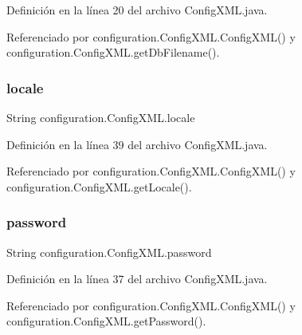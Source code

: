 Definición en la línea 20 del archivo Config\+X\+M\+L.\+java.



Referenciado por configuration.\+Config\+X\+M\+L.\+Config\+X\+M\+L() y configuration.\+Config\+X\+M\+L.\+get\+Db\+Filename().

\mbox{\label{classconfiguration_1_1_config_x_m_l_a34c81c18f387adacbf595cee3c0229b0}} 
\subsubsection{\texorpdfstring{locale}{locale}}
{\footnotesize\ttfamily String configuration.\+Config\+X\+M\+L.\+locale\hspace{0.3cm}{\ttfamily [private]}}



Definición en la línea 39 del archivo Config\+X\+M\+L.\+java.



Referenciado por configuration.\+Config\+X\+M\+L.\+Config\+X\+M\+L() y configuration.\+Config\+X\+M\+L.\+get\+Locale().

\mbox{\label{classconfiguration_1_1_config_x_m_l_a719187d1ff6398218cb8f6d7b0f53763}} 
\subsubsection{\texorpdfstring{password}{password}}
{\footnotesize\ttfamily String configuration.\+Config\+X\+M\+L.\+password\hspace{0.3cm}{\ttfamily [private]}}



Definición en la línea 37 del archivo Config\+X\+M\+L.\+java.



Referenciado por configuration.\+Config\+X\+M\+L.\+Config\+X\+M\+L() y configuration.\+Config\+X\+M\+L.\+get\+Password().

\mbox{\label{classconfiguration_1_1_config_x_m_l_a7993e8ab35ee8854e832e85bafe85964}} 
